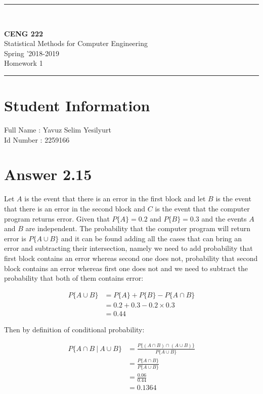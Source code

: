 \documentclass[12pt]{article}
\newcommand{\HRule}{\rule{\linewidth}{1mm}}
\begin{document}
\noindent
\HRule \\[3mm]
\begin{flushright}

                                         \LARGE \textbf{CENG 222}  \\[4mm]
                                         \Large Statistical Methods for Computer Engineering \\[4mm]
                                        \normalsize      Spring '2018-2019 \\
                                           \Large   Homework 1 \\
\end{flushright}
\HRule

\section*{Student Information }
Full Name : Yavuz Selim Yesilyurt \\
Id Number : 2259166 

\section*{Answer 2.15}
Let $A$ is the event that there is an error in the first block and let $B$ is the event that there is an error in the second block and $C$ is the event that the computer program returns error. Given that $P\{A\}= 0.2$ and $P\{B\} = 0.3$ and the events $A$ and $B$ are independent. The probability that the computer program will return error is $P\{A \cup B\}$ and it can be found adding all the cases that can bring an error and subtracting their intersection, namely we need to add probability that first block contains an error whereas second one does not, probability that second block contains an error whereas first one does not and we need to subtract the probability that both of them contains error: 

\begin{align*}
P\{A \cup B\} &= P\{A\} + P\{B\} - P\{A \cap B\} \\
&= 0.2 + 0.3 - 0.2 \times 0.3 \\
&= 0.44
\end{align*}

Then by definition of conditional probability:

\begin{align*}
P\{A \cap B \ | \ A \cup B\} &= \frac{P\{(A \cap B) \cap (A \cup B) \}}{P\{A \cup B\}}  \\
&= \frac{P\{A \cap B \}}{P\{A \cup B\}}  \\
&= \frac{0.06}{0.44} \\
&= 0.1364
\end{align*}
\end{document}
